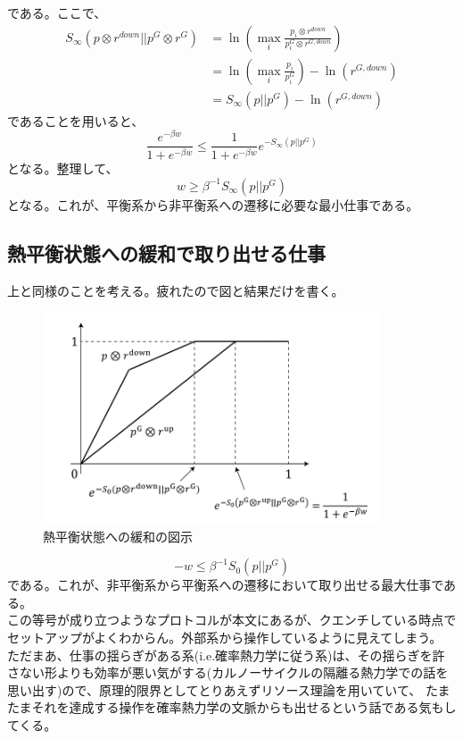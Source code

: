 \documentclass[a4paper,11pt]{jsarticle}
\numberwithin{equation}{section}
\begin{document}
である。ここで、
\begin{align}
    S_{\infty} (p\otimes r^{down}||p^G \otimes r^G) &= \ln (\underset{i}{\max}\frac{p_i\otimes r^{down}}{p_i^G \otimes r^{G,down}})\\
    &= \ln (\underset{i}{\max}\frac{p_i}{p_i^G})-\ln(r^{G,down})\\
    &= S_{\infty}(p||p^G) - \ln(r^{G,down})
\end{align}
であることを用いると、
\begin{equation}
    \frac{e^{-\beta w}}{1+e^{-\beta w}} \leq \frac{1}{1+e^{-\beta w}}e^{-S_{\infty}(p||p^G)}
\end{equation}
となる。整理して、
\begin{equation}
    w \geq \beta^{-1}S_{\infty}(p||p^G)
\end{equation}
となる。これが、平衡系から非平衡系への遷移に必要な最小仕事である。\\

\subsection{熱平衡状態への緩和で取り出せる仕事}
上と同様のことを考える。疲れたので図と結果だけを書く。\\
\begin{figure}[H]
    \begin{center}
    \includegraphics[width=100mm]{image6.png}
    \end{center}
    \caption{熱平衡状態への緩和の図示}
    \label{fig:six}
\end{figure}
\begin{equation}
    -w \leq \beta^{-1}S_{0}(p||p^G)
\end{equation}
である。これが、非平衡系から平衡系への遷移において取り出せる最大仕事である。\\

この等号が成り立つようなプロトコルが本文にあるが、クエンチしている時点でセットアップがよくわからん。外部系から操作しているように見えてしまう。\\
ただまあ、仕事の揺らぎがある系(i.e.確率熱力学に従う系)は、その揺らぎを許さない形よりも効率が悪い気がする(カルノーサイクルの隔離る熱力学での話を思い出す)ので、原理的限界としてとりあえずリソース理論を用いていて、
たまたまそれを達成する操作を確率熱力学の文脈からも出せるという話である気もしてくる。
\end{document}
